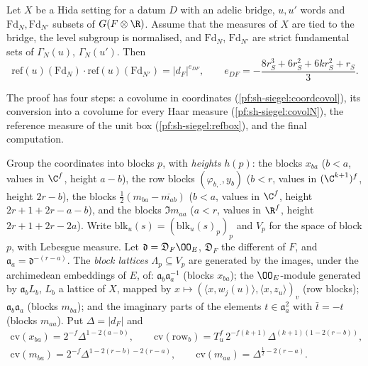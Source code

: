 \begin{theorem}\label{pf:sh-siegel:covolref}
Let $X$ be a Hida setting for a datum $D$ with an adelic bridge, $u,u'$ words and $\mathrm{Fd}_N,\mathrm{Fd}_{N'}$ subsets of
$G(F\otimes\R)$. Assume that the measures of $X$ are tied to the bridge, the level subgroup is normalised, and
$\mathrm{Fd}_N$, $\mathrm{Fd}_{N'}$ are strict fundamental sets of $\Gamma_N(u)$, $\Gamma_N(u')$. Then
\[
\mathrm{ref}(u)(\mathrm{Fd}_N)\cdot\mathrm{ref}(u)(\mathrm{Fd}_{N'})=|d_F|^{e_{DF}},\qquad
e_{DF}=-\frac{8r_S^3+6r_S^2+6kr_S^2+r_S}{3}.
\]
\end{theorem}

The proof has four steps: a covolume in coordinates (\cref{pf:sh-siegel:coordcovol}), its conversion into a covolume for every
Haar measure (\cref{pf:sh-siegel:covolN}), the reference measure of the unit box (\cref{pf:sh-siegel:refbox}), and the final
computation.

\begin{definition}\label{pf:sh-siegel:blkdef}
Group the coordinates into blocks $p$, with \emph{heights} $h(p)$: the blocks $x_{ba}$
($b<a$, values in $\C^f$, height $a-b$), the row blocks $(\varphi_{b,\cdot},y_b)$ ($b<r$, values in $(\C^{k+1})^f$, height
$2r-b$), the blocks $\frac12(m_{ba}-\overline{m_{ab}})$ ($b<a$, values in $\C^f$, height $2r+1+2r-a-b$), and the blocks
$\Im m_{aa}$ ($a<r$, values in $\R^f$, height $2r+1+2r-2a$). Write $\mathrm{blk}_u(s)=(\mathrm{blk}_u(s)_p)_p$ and $V_p$ for
the space of block $p$, with Lebesgue measure. Let $\mathfrak d=\mathfrak D_F\OO_E$, $\mathfrak D_F$ the different of $F$, and
$\mathfrak a_a=\mathfrak d^{-(r-a)}$. The \emph{block lattices} $\Lambda_p\subseteq V_p$ are generated by the images, under the
archimedean embeddings of $E$, of: $\mathfrak a_b\mathfrak a_a^{-1}$ (blocks $x_{ba}$); the $\OO_E$-module generated by
$\mathfrak a_bL_b$, $L_b$ a lattice of $X$, mapped by $x\mapsto(\langle x,w_j(u)\rangle,\langle x,z_u\rangle)_v$ (row blocks);
$\mathfrak a_b\mathfrak a_a$ (blocks $m_{ba}$); and the imaginary parts of the elements $t\in\mathfrak a_a^2$ with $\bar t=-t$
(blocks $m_{aa}$). Put $\Delta=|d_F|$ and
\begin{gather*}
\mathrm{cv}(x_{ba})=2^{-f}\Delta^{1-2(a-b)},\qquad
\mathrm{cv}(\mathrm{row}_b)=T_u^f\,2^{-f(k+1)}\Delta^{(k+1)(1-2(r-b))},\\
\mathrm{cv}(m_{ba})=2^{-f}\Delta^{1-2(r-b)-2(r-a)},\qquad\mathrm{cv}(m_{aa})=\Delta^{\frac12-2(r-a)} .
\end{gather*}
\ \ 
\end{definition}

